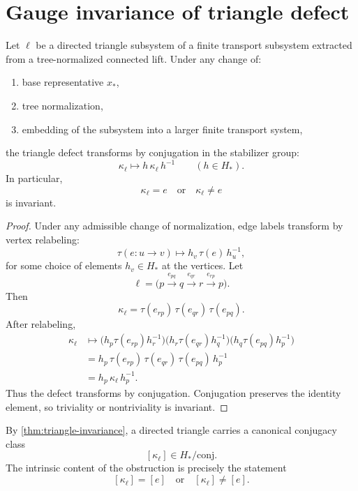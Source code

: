 \section{Gauge invariance of triangle defect}
\begin{theorem}
	\label{thm:triangle-invariance}
	Let \(\ell\) be a directed triangle subsystem of a finite transport
	subsystem extracted from a tree-normalized connected lift.
	Under any change of:
	\begin{enumerate}
		\item base representative \(x_*\),
		\item tree normalization,
		\item embedding of the subsystem into a larger finite transport system,
	\end{enumerate}
	the triangle defect transforms by conjugation in the stabilizer group:
	\[
		\kappa_\ell\mapsto h\,\kappa_\ell\,h^{-1}
		\qquad
		(h\in H_*).
	\]
	In particular,
	\[
		\kappa_\ell=e
		\quad\text{or}\quad
		\kappa_\ell\neq e
	\]
	is invariant.
\end{theorem}
\begin{proof}
	Under any admissible change of normalization, edge labels transform by
	vertex relabeling:
	\[
		\tau(e:u\to v)\mapsto h_v\,\tau(e)\,h_u^{-1},
	\]
	for some choice of elements \(h_v\in H_*\) at the vertices.
	Let
	\[
		\ell=
		\bigl(
		p\xrightarrow{e_{pq}}q\xrightarrow{e_{qr}}r\xrightarrow{e_{rp}}p
		\bigr).
	\]
	Then
	\[
		\kappa_\ell
		=
		\tau(e_{rp})\,\tau(e_{qr})\,\tau(e_{pq}).
	\]
	After relabeling,
	\begin{align*}
		\kappa_\ell
		 & \mapsto
		\bigl(h_p\tau(e_{rp})h_r^{-1}\bigr)
		\bigl(h_r\tau(e_{qr})h_q^{-1}\bigr)
		\bigl(h_q\tau(e_{pq})h_p^{-1}\bigr)                     \\
		 & =
		h_p\,\tau(e_{rp})\,\tau(e_{qr})\,\tau(e_{pq})\,h_p^{-1} \\
		 & =
		h_p\,\kappa_\ell\,h_p^{-1}.
	\end{align*}
	Thus the defect transforms by conjugation. Conjugation preserves the
	identity element, so triviality or nontriviality is invariant.
\end{proof}
\begin{remark}
	By \cref{thm:triangle-invariance}, a directed triangle carries a
	canonical conjugacy class
	\[
		[\kappa_\ell]\in H_*/\mathrm{conj}.
	\]
	The intrinsic content of the obstruction is precisely the statement
	\[
		[\kappa_\ell]=[e]
		\quad\text{or}\quad
		[\kappa_\ell]\neq [e].
	\]
\end{remark}
